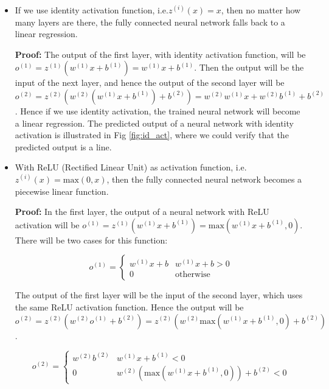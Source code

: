 \begin{itemize}
\item
  If we use identity activation function, i.e.$z^{(i)}(x)=x$, then no
  matter how many layers are there, the fully connected neural network
  falls back to a linear regression.

  \textbf{Proof:} The output of the first layer, with identity activation function, will be $o^{(1)}=z^{(1)}(w^{(1)}x+b^{(1)})=w^{(1)}x+b^{(1)}$. Then the output will be the input of the next layer, and hence the output of the second layer will be $o^{(2)}=z^{(2)}(w^{(2)}(w^{(1)}x+b^{(1)})+b^{(2)})=w^{(2)}w^{(1)}x+w^{(2)}b^{(1)}+b^{(2)}$. Hence if we use identity activation, the trained neural network will become a linear regression. The predicted output of a neural network with identity activation is illustrated in Fig \ref{fig:id_act}, where we could verify that the predicted output is a line.
\item
  With ReLU (Rectified Linear Unit) as activation function, i.e. $z^{(i)}(x)=\text{max}(0,x)$, then the fully connected neural network becomes a piecewise linear function.

\textbf{Proof:} In the first layer, the output of a neural network with ReLU activation will be $o^{(1)}=z^{(1)}(w^{(1)}x+b^{(1)})=\text{max}(w^{(1)}x+b^{(1)},0)$. There will be two cases for this function:

\begin{equation}
	o^{(1)}=\begin{cases}	
		w^{(1)}x+b & w^{(1)}x+b>0 \\
		0 & \text{otherwise}
	\end{cases}
\end{equation}

The output of the first layer will be the input of the second layer, which uses the same ReLU activation function. Hence the output will be $o^{(2)}=z^{(2)}(w^{(2)}o^{(1)}+b^{(2)})=z^{(2)}(w^{(2)}\text{max}(w^{(1)}x+b^{(1)},0)+b^{(2)})$.

\begin{equation}
	o^{(2)}= \begin{cases}
		w^{(2)}b^{(2)} & w^{(1)}x+b^{(1)}<0 \\
		0 & w^{(2)}(\text{max}(w^{(1)}x+b^{(1)},0))+b^{(2)}<0 
	\end{cases}	
\end{equation}
\end{itemize}